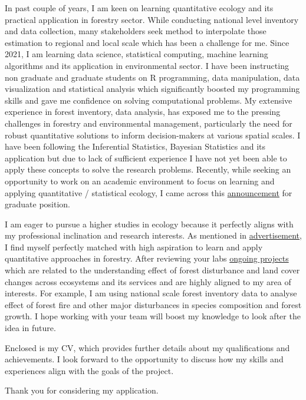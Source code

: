 \documentclass[
]{article}
\begin{document}
In past couple of years, I am keen on learning quantitative ecology and
its practical application in forestry sector. While conducting national
level inventory and data collection, many stakeholders seek method to
interpolate those estimation to regional and local scale which has been
a challenge for me. Since 2021, I am learning data science, statistical
computing, machine learning algorithms and its application in
environmental sector. I have been instructing non graduate and graduate
students on R programming, data manipulation, data visualization and
statistical analysis which significantly boosted my programming skills
and gave me confidence on solving computational problems. My extensive
experience in forest inventory, data analysis, has exposed me to the
pressing challenges in forestry and environmental management,
particularly the need for robust quantitative solutions to inform
decision-makers at various spatial scales. I have been following the
Inferential Statistics, Bayesian Statistics and its application but due
to lack of sufficient experience I have not yet been able to apply these
concepts to solve the research problems. Recently, while seeking an
opportunity to work on an academic environment to focus on learning and
applying quantitative / statistical ecology, I came across this
\href{https://uriartelab.org/opportunities/}{announcement} for graduate
position.

I am eager to pursue a higher studies in ecology because it perfectly
aligns with my professional inclination and research interests. As
mentioned in
\href{https://uriartelab.org/opportunities/}{advertisement}, I find
myself perfectly matched with high aspiration to learn and apply
quantitative approaches in forestry. After reviewing your labs
\href{https://www.columbia.edu/~mu2126/researchprojects.html}{ongoing
projects} which are related to the understanding effect of forest
disturbance and land cover changes across ecosystems and its services
and are highly aligned to my area of interests. For example, I am using
national scale forest inventory data to analyse effect of forest fire
and other major disturbances in species composition and forest growth. I
hope working with your team will boost my knowledge to look after the
idea in future.

Enclosed is my CV, which provides further details about my
qualifications and achievements. I look forward to the opportunity to
discuss how my skills and experiences align with the goals of the
project.

Thank you for considering my application.
\end{document}
